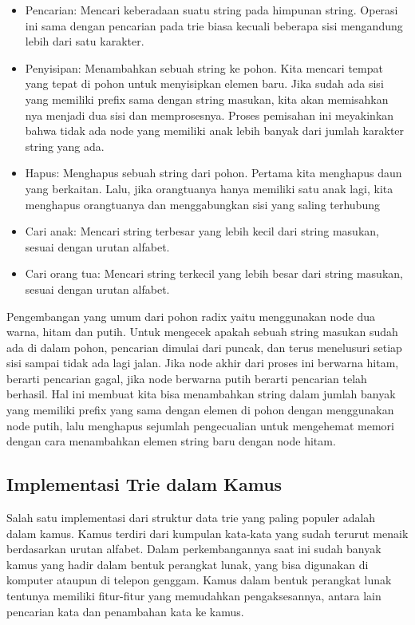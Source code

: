 \begin{itemize}
	\item Pencarian: Mencari keberadaan suatu string pada himpunan string. Operasi ini sama dengan pencarian pada trie biasa kecuali beberapa sisi mengandung lebih dari satu karakter.
	\item Penyisipan: Menambahkan sebuah string ke pohon. Kita mencari tempat yang tepat di pohon untuk menyisipkan elemen baru. Jika sudah ada sisi yang memiliki prefix sama dengan string masukan, kita akan memisahkan nya menjadi dua sisi dan memprosesnya. Proses pemisahan ini meyakinkan bahwa tidak ada node yang memiliki anak lebih banyak dari jumlah karakter string yang ada.
	\item Hapus: Menghapus sebuah string dari pohon. Pertama kita menghapus daun yang berkaitan. Lalu, jika orangtuanya hanya memiliki satu anak lagi, kita menghapus orangtuanya dan menggabungkan sisi yang saling terhubung
	\item Cari anak: Mencari string terbesar yang lebih kecil dari string masukan, sesuai dengan urutan alfabet.
	\item Cari orang tua: Mencari string terkecil yang lebih besar dari string masukan, sesuai dengan urutan alfabet.
\end{itemize}

Pengembangan yang umum dari pohon radix yaitu menggunakan node dua warna, hitam dan putih. Untuk mengecek apakah sebuah string masukan sudah ada di dalam pohon, pencarian dimulai dari puncak, dan terus menelusuri setiap sisi sampai tidak ada lagi jalan. Jika node akhir dari proses ini berwarna hitam, berarti pencarian gagal, jika node berwarna putih berarti pencarian telah berhasil. Hal ini membuat kita bisa menambahkan string dalam jumlah banyak yang memiliki prefix yang sama dengan elemen di pohon dengan menggunakan node putih, lalu menghapus sejumlah pengecualian untuk mengehemat memori dengan cara menambahkan elemen string baru dengan node hitam.

\subsection{Implementasi Trie dalam Kamus}
\label{sec:kamus}

Salah satu implementasi dari struktur data trie yang paling populer adalah dalam kamus. Kamus terdiri dari kumpulan kata-kata yang sudah terurut menaik berdasarkan urutan alfabet. Dalam perkembangannya saat ini sudah banyak kamus yang hadir dalam bentuk perangkat lunak, yang bisa digunakan di komputer ataupun di telepon genggam. Kamus dalam bentuk perangkat lunak tentunya memiliki fitur-fitur yang memudahkan pengaksesannya, antara lain pencarian kata dan penambahan kata ke kamus.

